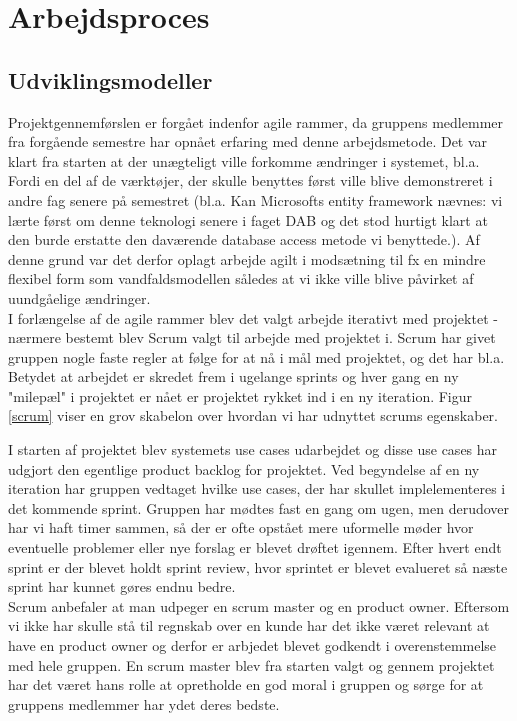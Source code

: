 \section{Arbejdsproces}

\subsection{Udviklingsmodeller}
Projektgennemførslen er forgået indenfor agile rammer, da gruppens medlemmer fra forgående semestre har opnået erfaring med denne arbejdsmetode. Det var klart fra starten at der unægteligt ville forkomme ændringer i systemet, bl.a. Fordi en del af de værktøjer, der skulle benyttes først ville blive demonstreret i andre fag senere på semestret (bl.a. Kan Microsofts entity framework nævnes: vi lærte først om denne teknologi senere i faget DAB og det stod hurtigt klart at den burde erstatte den daværende database access metode vi benyttede.). Af denne grund var det derfor oplagt arbejde agilt i modsætning til fx en mindre flexibel form som vandfaldsmodellen således at vi ikke ville blive påvirket af uundgåelige ændringer. \\
I forlængelse af de agile rammer blev det valgt arbejde iterativt med projektet - nærmere bestemt blev Scrum valgt til arbejde med projektet i. Scrum har givet gruppen nogle faste regler at følge for at nå i mål med projektet, og det har bl.a. Betydet at arbejdet er skredet frem i ugelange sprints og hver gang en ny "milepæl" i projektet er nået er projektet rykket ind i en ny iteration. Figur \ref{scrum} viser en grov skabelon over hvordan vi har udnyttet scrums egenskaber. 


I starten af projektet blev systemets use cases udarbejdet og disse use cases har udgjort den egentlige product backlog for projektet. Ved begyndelse af en ny iteration har gruppen vedtaget hvilke use cases, der har skullet implelementeres i det kommende sprint. Gruppen har mødtes fast en gang om ugen, men derudover har vi haft timer sammen, så der er ofte opstået mere uformelle møder hvor eventuelle problemer eller nye forslag er blevet drøftet igennem. Efter hvert endt sprint er der blevet holdt sprint review, hvor sprintet er blevet evalueret så næste sprint har kunnet gøres endnu bedre.  \\
Scrum anbefaler at man udpeger en scrum master og en product owner. Eftersom vi ikke har skulle stå til regnskab over en kunde har det ikke været relevant at have en product owner og derfor er arbjedet blevet godkendt i overenstemmelse med hele gruppen. En scrum master blev fra starten valgt og gennem projektet har det været hans rolle at opretholde en god moral i gruppen og sørge for at gruppens medlemmer har ydet deres bedste.
\\
\\

